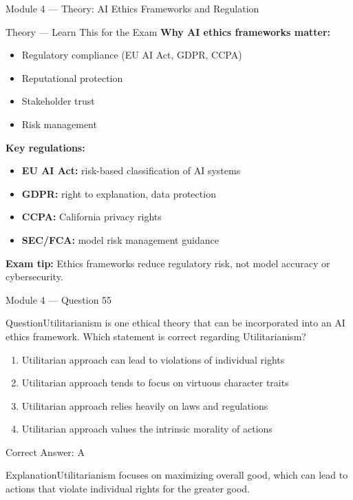 \documentclass[aspectratio=169,10pt]{beamer}
\newcommand{\question}[1]{\begin{block}{Question}#1\end{block}}
\newcommand{\options}[4]{%
	\begin{enumerate}[label=\Alph*.,leftmargin=*]
		\item #1
		\item #2
		\item #3
		\item #4
	\end{enumerate}
}
\newcommand{\answerbox}[1]{\begin{exampleblock}{Correct Answer: #1}\end{exampleblock}}
\newcommand{\explain}[1]{\begin{block}{Explanation}#1\end{block}}
\newcommand{\theory}[1]{%
	\begin{block}{Theory --- Learn This for the Exam}
		\small #1
	\end{block}
}
\begin{document}
	\begin{frame}{Module 4 --- Theory: AI Ethics Frameworks and Regulation}
		\theory{
			\textbf{Why AI ethics frameworks matter:}
			\begin{itemize}
				\item Regulatory compliance (EU AI Act, GDPR, CCPA)
				\item Reputational protection
				\item Stakeholder trust
				\item Risk management
			\end{itemize}
			\textbf{Key regulations:}
			\begin{itemize}
				\item \textbf{EU AI Act:} risk-based classification of AI systems
				\item \textbf{GDPR:} right to explanation, data protection
				\item \textbf{CCPA:} California privacy rights
				\item \textbf{SEC/FCA:} model risk management guidance
			\end{itemize}
			\textbf{Exam tip:} Ethics frameworks reduce regulatory risk, not model accuracy or cybersecurity.
		}
	\end{frame}
	
	\begin{frame}{Module 4 --- Question 55}
		\question{Utilitarianism is one ethical theory that can be incorporated into an AI ethics framework. Which statement is correct regarding Utilitarianism?}
		\options{Utilitarian approach can lead to violations of individual rights}{Utilitarian approach tends to focus on virtuous character traits}{Utilitarian approach relies heavily on laws and regulations}{Utilitarian approach values the intrinsic morality of actions}
		\answerbox{A}
		\explain{Utilitarianism focuses on maximizing overall good, which can lead to actions that violate individual rights for the greater good.}
	\end{frame}
	
\end{document}
